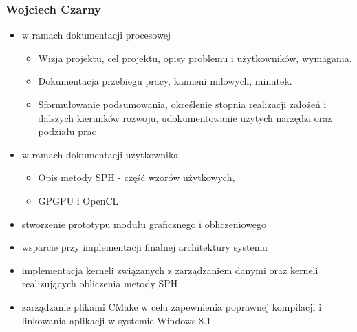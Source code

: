 \documentclass[polish, 12pt]{aghthesis}
\begin{document}
	\subsubsection*{Wojciech Czarny} 
		
		\begin{itemize}
			
			\item w ramach dokumentacji procesowej
			
				\begin{itemize}
				
					\item Wizja projektu, cel projektu, opisy problemu i użytkowników, wymagania.
					
					\item Dokumentacja przebiegu pracy, kamieni milowych, minutek.
					
					\item Sformułowanie podsumowania, określenie stopnia realizacji założeń i dalszych kierunków rozwoju, udokumentowanie użytych narzędzi oraz podziału prac
				
				\end{itemize}
			
			\item w ramach dokumentacji użytkownika
			
				\begin{itemize}
				
					\item Opis metody SPH - część wzorów użytkowych, 
					
					\item GPGPU i OpenCL
				
				\end{itemize}
				
			
			\item stworzenie prototypu modułu graficznego i obliczeniowego
			
			\item wsparcie przy implementacji finalnej architektury systemu
			
			\item implementacja kerneli związanych z zarządzaniem danymi oraz kerneli realizujących obliczenia metody SPH
					
			\item zarządzanie plikami CMake w celu zapewnienia poprawnej kompilacji i linkowania aplikacji w systemie Windows 8.1
		
		\end{itemize}
\end{document}
